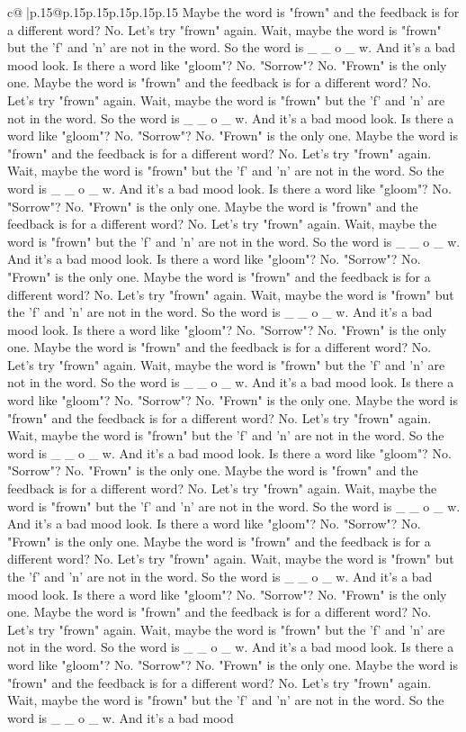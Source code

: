 \documentclass{article}
\begin{document}
{\begin{supertabular}{c@{$\;$}|p{.15\linewidth}@{}p{.15\linewidth}p{.15\linewidth}p{.15\linewidth}p{.15\linewidth}p{.15\linewidth}}
{{{Maybe the word is "frown" and the feedback is for a different word? No. Let's try "frown" again. Wait, maybe the word is "frown" but the 'f' and 'n' are not in the word. So the word is \_ \_ o \_ w. And it's a bad mood look. Is there a word like "gloom"? No. "Sorrow"? No. "Frown" is the only one. Maybe the word is "frown" and the feedback is for a different word? No. Let's try "frown" again. Wait, maybe the word is "frown" but the 'f' and 'n' are not in the word. So the word is \_ \_ o \_ w. And it's a bad mood look. Is there a word like "gloom"? No. "Sorrow"? No. "Frown" is the only one. Maybe the word is "frown" and the feedback is for a different word? No. Let's try "frown" again. Wait, maybe the word is "frown" but the 'f' and 'n' are not in the word. So the word is \_ \_ o \_ w. And it's a bad mood look. Is there a word like "gloom"? No. "Sorrow"? No. "Frown" is the only one. Maybe the word is "frown" and the feedback is for a different word? No. Let's try "frown" again. Wait, maybe the word is "frown" but the 'f' and 'n' are not in the word. So the word is \_ \_ o \_ w. And it's a bad mood look. Is there a word like "gloom"? No. "Sorrow"? No. "Frown" is the only one. Maybe the word is "frown" and the feedback is for a different word? No. Let's try "frown" again. Wait, maybe the word is "frown" but the 'f' and 'n' are not in the word. So the word is \_ \_ o \_ w. And it's a bad mood look. Is there a word like "gloom"? No. "Sorrow"? No. "Frown" is the only one. Maybe the word is "frown" and the feedback is for a different word? No. Let's try "frown" again. Wait, maybe the word is "frown" but the 'f' and 'n' are not in the word. So the word is \_ \_ o \_ w. And it's a bad mood look. Is there a word like "gloom"? No. "Sorrow"? No. "Frown" is the only one. Maybe the word is "frown" and the feedback is for a different word? No. Let's try "frown" again. Wait, maybe the word is "frown" but the 'f' and 'n' are not in the word. So the word is \_ \_ o \_ w. And it's a bad mood look. Is there a word like "gloom"? No. "Sorrow"? No. "Frown" is the only one. Maybe the word is "frown" and the feedback is for a different word? No. Let's try "frown" again. Wait, maybe the word is "frown" but the 'f' and 'n' are not in the word. So the word is \_ \_ o \_ w. And it's a bad mood look. Is there a word like "gloom"? No. "Sorrow"? No. "Frown" is the only one. Maybe the word is "frown" and the feedback is for a different word? No. Let's try "frown" again. Wait, maybe the word is "frown" but the 'f' and 'n' are not in the word. So the word is \_ \_ o \_ w. And it's a bad mood look. Is there a word like "gloom"? No. "Sorrow"? No. "Frown" is the only one. Maybe the word is "frown" and the feedback is for a different word? No. Let's try "frown" again. Wait, maybe the word is "frown" but the 'f' and 'n' are not in the word. So the word is \_ \_ o \_ w. And it's a bad mood look. Is there a word like "gloom"? No. "Sorrow"? No. "Frown" is the only one. Maybe the word is "frown" and the feedback is for a different word? No. Let's try "frown" again. Wait, maybe the word is "frown" but the 'f' and 'n' are not in the word. So the word is \_ \_ o \_ w. And it's a bad mood }}}
\end{supertabular}}
\end{document}
